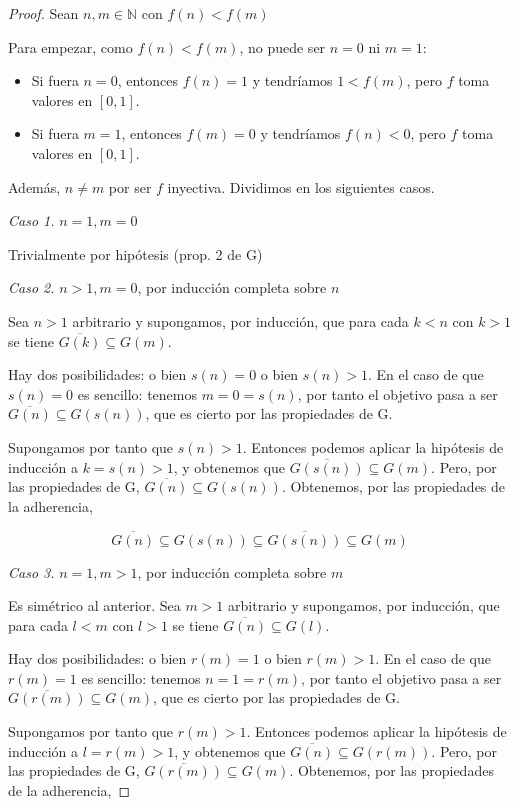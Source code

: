 \documentclass{article}
\newcommand{\nat}{\mathbb{N}}
\begin{document}
\begin{proof}

Sean $n, m \in \nat$ con $f(n) < f(m)$

Para empezar, como $f(n) < f(m)$, no puede ser $n=0$ ni $m=1$:

\begin{itemize}
  \item Si fuera $n = 0$, entonces $f(n) = 1$ y tendríamos $1 < f(m)$, pero $f$ toma valores en $[0, 1]$.
  \item Si fuera $m = 1$, entonces $f(m) = 0$ y tendríamos $f(n) < 0$, pero $f$ toma valores en $[0, 1]$.
\end{itemize}

Además, $n \neq m$ por ser $f$ inyectiva. Dividimos en los siguientes casos.

\textit{Caso 1.} $n = 1, m = 0$

Trivialmente por hipótesis (prop. 2 de G)

\textit{Caso 2.} $n > 1, m = 0$, por inducción completa sobre $n$

Sea $n>1$ arbitrario y supongamos, por inducción, que para cada $k < n$ con $k > 1$ se tiene $\overline{G(k)} \subseteq G(m)$.

Hay dos posibilidades: o bien $s(n)=0$ o bien $s(n)>1$. En el caso de que $s(n)=0$ es sencillo: tenemos $m=0=s(n)$, por tanto el objetivo pasa a ser $\overline{G(n)} \subseteq G(s(n))$, que es cierto por las propiedades de G.

Supongamos por tanto que $s(n)>1$. Entonces podemos aplicar la hipótesis de inducción a $k=s(n)>1$, y obtenemos que $\overline{G(s(n))} \subseteq G(m)$. Pero, por las propiedades de G,  $\overline{G(n)} \subseteq G(s(n))$. Obtenemos, por las propiedades de la adherencia,

$$\overline{G(n)} \subseteq G(s(n)) \subseteq \overline{G(s(n))} \subseteq G(m)$$

\textit{Caso 3.} $n = 1, m > 1$, por inducción completa sobre $m$

Es simétrico al anterior. Sea $m>1$ arbitrario y supongamos, por inducción, que para cada $l < m$ con $l > 1$ se tiene $\overline{G(n)} \subseteq G(l)$.

Hay dos posibilidades: o bien $r(m)=1$ o bien $r(m)>1$. En el caso de que $r(m)=1$ es sencillo: tenemos $n=1=r(m)$, por tanto el objetivo pasa a ser $\overline{G(r(m))} \subseteq G(m)$, que es cierto por las propiedades de G.

Supongamos por tanto que $r(m)>1$. Entonces podemos aplicar la hipótesis de inducción a $l=r(m)>1$, y obtenemos que $\overline{G(n)} \subseteq G(r(m))$. Pero, por las propiedades de G,  $\overline{G(r(m))} \subseteq G(m)$. Obtenemos, por las propiedades de la adherencia,


\end{proof}
\end{document}
